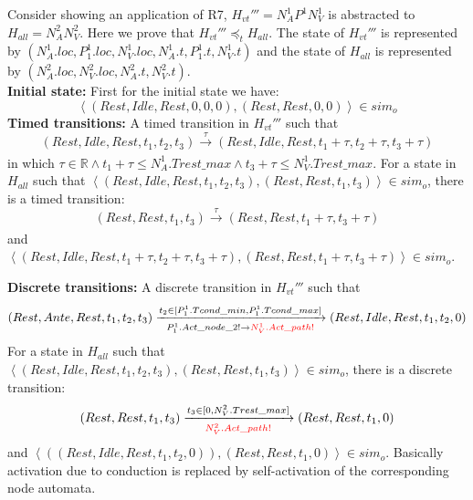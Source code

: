 Consider  showing an application of R7, $H_{vt}'''=N^1_AP^1N^1_V$ is abstracted to $H_{all}=N^2_AN^2_V$. Here we prove that $H_{vt}'''\preceq_t H_{all}$. The state of $H_{vt}'''$ is represented by $(N^1_A.loc,P^1_1.loc,N^1_V.loc,N^1_A.t,P^1_1.t,N^1_V.t)$ and the state of $H_{all}$ is represented by $(N^2_A.loc,N^2_V.loc,N^2_A.t,N^2_V.t)$. \\
\textbf{Initial state: }First for the initial state we have:
$$\left\langle (Rest,Idle,Rest,0,0,0),(Rest,Rest,0,0)\right\rangle\in sim_o$$ 
\textbf{Timed transitions: }A timed transition in $H_{vt}'''$ such that
$$(Rest,Idle,Rest,t_1,t_2,t_3)\xrightarrow[]{\tau}(Rest,Idle,Rest,t_1+\tau,t_2+\tau,t_3+\tau)$$
in which $\tau\in\mathbb{R}\wedge t_1+\tau\leq N^1_A.Trest\_max\wedge t_3+\tau\leq N^1_V.Trest\_max$. For a state in $H_{all}$ such that $\left\langle (Rest,Idle,Rest,t_1,t_2,t_3),(Rest,Rest,t_1,t_3)\right\rangle\in sim_o$,  there is a timed transition:
$$(Rest,Rest,t_1,t_3)\xrightarrow[]{\tau}(Rest,Rest,t_1+\tau,t_3+\tau)$$
and $\left\langle (Rest,Idle,Rest,t_1+\tau,t_2+\tau,t_3+\tau),(Rest,Rest,t_1+\tau,t_3+\tau)\right\rangle\in sim_o$.
%

\textbf{Discrete transitions: }A discrete transition in $H_{vt}'''$ such that
$$(Rest,Ante,Rest,t_1,t_2,t_3)\xrightarrow[P^1_1.Act\_node\_2!\rightarrow \textcolor{red}{N^1_V.Act\_path!}]{t_2\in [P^1_1.Tcond\_min, P^1_1.Tcond\_max] }(Rest,Idle,Rest,t_1,t_2,0)$$
For a state in $H_{all}$ such that $\left\langle (Rest,Idle,Rest,t_1,t_2,t_3),(Rest,Rest,t_1,t_3)\right\rangle\in sim_o$,  there is a discrete transition:
$$(Rest,Rest,t_1,t_3)\xrightarrow[\textcolor{red}{N^2_V.Act\_path!}]{t_3\in [0, N^2_V.Trest\_max]}(Rest,Rest,t_1,0)$$
and $\left\langle ((Rest,Idle,Rest,t_1,t_2,0)),(Rest,Rest,t_1,0)\right\rangle\in sim_o$. Basically activation due to conduction is replaced by self-activation of the corresponding node automata.

